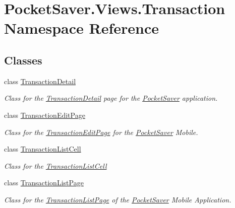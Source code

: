 \hypertarget{namespace_pocket_saver_1_1_views_1_1_transaction}{}\section{Pocket\+Saver.\+Views.\+Transaction Namespace Reference}
\label{namespace_pocket_saver_1_1_views_1_1_transaction}
\subsection*{Classes}
\begin{DoxyCompactItemize}
\item 
class \hyperlink{class_pocket_saver_1_1_views_1_1_transaction_1_1_transaction_detail}{Transaction\+Detail}
\begin{DoxyCompactList}\small\item\em Class for the \hyperlink{class_pocket_saver_1_1_views_1_1_transaction_1_1_transaction_detail}{Transaction\+Detail} page for the \hyperlink{namespace_pocket_saver}{Pocket\+Saver} application. \end{DoxyCompactList}\item 
class \hyperlink{class_pocket_saver_1_1_views_1_1_transaction_1_1_transaction_edit_page}{Transaction\+Edit\+Page}
\begin{DoxyCompactList}\small\item\em Class for the \hyperlink{class_pocket_saver_1_1_views_1_1_transaction_1_1_transaction_edit_page}{Transaction\+Edit\+Page} for the \hyperlink{namespace_pocket_saver}{Pocket\+Saver} Mobile. \end{DoxyCompactList}\item 
class \hyperlink{class_pocket_saver_1_1_views_1_1_transaction_1_1_transaction_list_cell}{Transaction\+List\+Cell}
\begin{DoxyCompactList}\small\item\em Class for the \hyperlink{class_pocket_saver_1_1_views_1_1_transaction_1_1_transaction_list_cell}{Transaction\+List\+Cell} \end{DoxyCompactList}\item 
class \hyperlink{class_pocket_saver_1_1_views_1_1_transaction_1_1_transaction_list_page}{Transaction\+List\+Page}
\begin{DoxyCompactList}\small\item\em Class for the \hyperlink{class_pocket_saver_1_1_views_1_1_transaction_1_1_transaction_list_page}{Transaction\+List\+Page} of the \hyperlink{namespace_pocket_saver}{Pocket\+Saver} Mobile Application. \end{DoxyCompactList}\end{DoxyCompactItemize}

